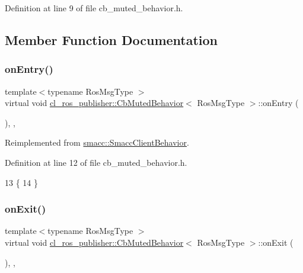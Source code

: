 Definition at line 9 of file cb\+\_\+muted\+\_\+behavior.\+h.



\subsection{Member Function Documentation}
\mbox{\label{classcl__ros__publisher_1_1CbMutedBehavior_a79376d9160e3bd44678a2c0d89f1b4de}} 
\subsubsection{\texorpdfstring{on\+Entry()}{onEntry()}}
{\footnotesize\ttfamily template$<$typename Ros\+Msg\+Type $>$ \\
virtual void \hyperlink{classcl__ros__publisher_1_1CbMutedBehavior}{cl\+\_\+ros\+\_\+publisher\+::\+Cb\+Muted\+Behavior}$<$ Ros\+Msg\+Type $>$\+::on\+Entry (\begin{DoxyParamCaption}{ }\end{DoxyParamCaption})\hspace{0.3cm}{\ttfamily [inline]}, {\ttfamily [override]}, {\ttfamily [virtual]}}



Reimplemented from \hyperlink{classsmacc_1_1SmaccClientBehavior_a7962382f93987c720ad432fef55b123f}{smacc\+::\+Smacc\+Client\+Behavior}.



Definition at line 12 of file cb\+\_\+muted\+\_\+behavior.\+h.


\begin{DoxyCode}
13     \{
14     \}
\end{DoxyCode}
\mbox{\label{classcl__ros__publisher_1_1CbMutedBehavior_a4c02187c58358fa811777d9956510222}} 
\subsubsection{\texorpdfstring{on\+Exit()}{onExit()}}
{\footnotesize\ttfamily template$<$typename Ros\+Msg\+Type $>$ \\
virtual void \hyperlink{classcl__ros__publisher_1_1CbMutedBehavior}{cl\+\_\+ros\+\_\+publisher\+::\+Cb\+Muted\+Behavior}$<$ Ros\+Msg\+Type $>$\+::on\+Exit (\begin{DoxyParamCaption}{ }\end{DoxyParamCaption})\hspace{0.3cm}{\ttfamily [inline]}, {\ttfamily [override]}, {\ttfamily [virtual]}}



